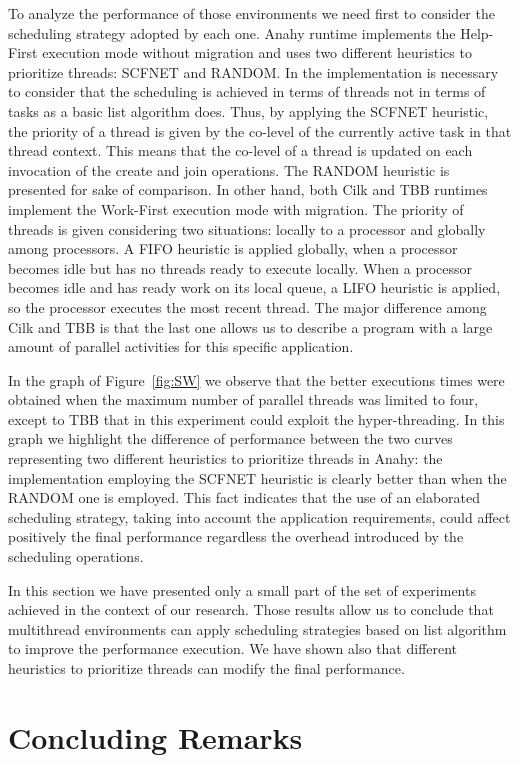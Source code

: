 \documentclass[twocolumn]{svjour3}
\begin{document}
To analyze the performance of those environments we need first to consider the scheduling strategy adopted by each one. Anahy runtime implements the Help-First execution mode without migration and uses two different heuristics to prioritize threads: SCFNET and RANDOM. In the implementation is necessary to consider that the scheduling is achieved in terms of threads not in terms of tasks as a basic list algorithm does. Thus, by applying the SCFNET heuristic, the priority of a thread is given by the co-level of the currently active task in that thread context. This means that the co-level of a thread is updated on each invocation of the create and join operations. The RANDOM heuristic is presented for sake of comparison. In other hand, both Cilk and TBB runtimes implement the Work-First execution mode with migration. The priority of threads is given considering two situations: locally to a processor and globally among processors. A FIFO heuristic is applied globally, when a processor becomes idle but has no threads ready to execute locally. When a processor becomes idle and has ready work on its local queue, a LIFO heuristic is applied, so the processor executes the most recent thread. The major difference among Cilk and TBB is that the last one allows us to describe a program with a large amount of parallel activities for this specific application.

In the graph of Figure~\ref{fig:SW} we observe that the better executions times were obtained when the maximum number of parallel threads was limited to four, except to TBB that in this experiment could exploit the hyper-threading. In this graph we highlight the difference of performance between the two curves representing two different heuristics to prioritize threads in Anahy: the implementation employing the SCFNET heuristic is clearly better than when the RANDOM one is employed. This fact indicates that the use of an elaborated scheduling strategy, taking into account the application requirements, could affect positively the final performance regardless the overhead introduced by the scheduling operations.

In this section we have presented only a small part of the set of experiments achieved in the context of our research. Those results allow us to conclude that multithread environments can apply scheduling strategies based on list algorithm to improve the performance execution. We have shown also that different heuristics to prioritize threads can modify the final performance.

\section{Concluding Remarks}\label{sec:conclusion}
\end{document}
